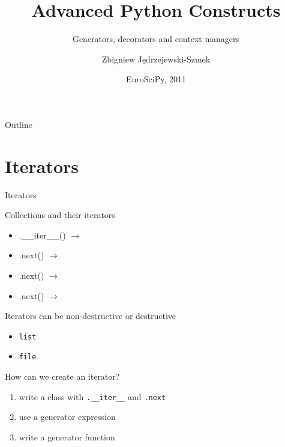 \documentclass{beamer}
\title{Advanced Python Constructs}
\subtitle{Generators, decorators and context managers}
\author{Zbigniew Jędrzejewski-Szmek}
\date{EuroSciPy, 2011}
\newcommand{\lra}{\ensuremath{\longrightarrow}}
\begin{document}

\begin{frame}{Outline}
  \tableofcontents
\end{frame}

\section{Iterators}

\begin{frame}{}
  \center\Huge Iterators
\end{frame}

\begin{frame}[fragile]{Collections and their iterators}
  \begin{itemize}
    \item
      \pause.\_\_iter\_\_() \pause \lra {}
      \pause
    \item
      .next() \lra {}
      \pause
    \item
      .next() \lra {}
      \pause
    \item
      .next() \lra {}
  \end{itemize}
\end{frame}

\begin{frame}{Iterators can be non-destructive or destructive}
  \begin{itemize}
    \item \texttt{list}
    \item \texttt{file}
  \end{itemize}
\end{frame}

\begin{frame}[fragile]{How can we create an iterator?}

  \begin{enumerate}[<+->]
    \item write a class with \verb|.__iter__| and \verb|.next|
    \item use a generator expression
    \item write a generator function
  \end{enumerate}
\end{frame}
\end{document}

